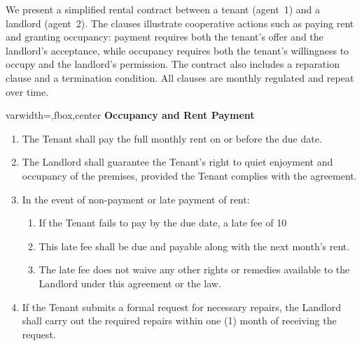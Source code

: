 \documentclass{article}
\begin{document}
  \begin{example}\label{ME}
    We present a simplified rental contract between a tenant (agent~1) and a landlord (agent~2).
    The clauses illustrate cooperative actions such as paying rent and granting occupancy:
    payment requires both the tenant’s offer and the landlord’s acceptance, while occupancy requires
    both the tenant’s willingness to occupy and the landlord’s permission.
    The contract also includes a reparation clause and a termination condition.
    All clauses are monthly regulated and repeat over time.
    
    \begin{adjustbox}{varwidth=\textwidth,fbox,center}
    \textbf{Occupancy and Rent Payment}
    \begin{enumerate}[label={(C\arabic*)}]
    \item The Tenant shall pay the full monthly rent on or before the due date.
    \item The Landlord shall guarantee the Tenant’s right to quiet enjoyment and occupancy of the premises, provided the Tenant complies with the agreement.
    \item In the event of non-payment or late payment of rent:
    \begin{enumerate}[label={(\roman*)}]
    \item If the Tenant fails to pay by the due date, a late fee of 10%
    \item This late fee shall be due and payable along with the next month’s rent.
    \item The late fee does not waive any other rights or remedies available to the Landlord under this agreement or the law.
    \end{enumerate}
    \item If the Tenant submits a formal request for necessary repairs, the Landlord shall carry out the required repairs within one (1) month of receiving the request.
    \end{enumerate}
    

\end{adjustbox}
\end{example}
\end{document}
